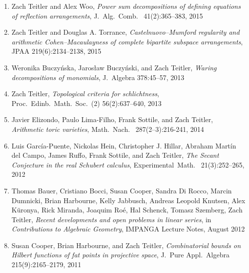\documentclass[12pt]{article}
\begin{document}
\begin{enumerate}
\item Zach Teitler and Alex Woo,
\emph{Power sum decompositions of defining equations of reflection arrangements},
J.~Alg.\ Comb.\
41(2):365--383, 2015

\item Zach Teitler and Douglas A. Torrance,
\emph{Castelnuovo--Mumford regularity and arithmetic Cohen--Macaulayness of complete bipartite subspace arrangements},
JPAA
219(6):2134--2138, 2015

\item Weronika Buczy\'nska, Jaros{\l}aw Buczy\'nski, and Zach Teitler,
\emph{Waring decompositions of monomials},
J.\ Algebra
378:45--57, 2013

\item Zach Teitler,
\emph{Topological criteria for schlichtness},
Proc.\ Edinb.\ Math.\ Soc.\ (2)
56(2):637--640, 2013

\item Javier Elizondo, Paulo Lima-Filho, Frank Sottile, and Zach Teitler,
\emph{Arithmetic toric varieties},
Math.\ Nach.\
287(2--3):216-241, 2014

\item Luis Garc\'ia-Puente, Nickolas Hein, Christopher J. Hillar, Abraham Mart\'in del Campo, James Ruffo, Frank Sottile, and Zach Teitler,
\emph{The Secant Conjecture in the real Schubert calculus},
Experimental~Math.\
21(3):252--265, 2012

\item
Thomas Bauer, Cristiano Bocci, Susan Cooper, Sandra Di Rocco, Marcin Dumnicki, Brian Harbourne, Kelly Jabbusch, Andreas Leopold Knutsen, Alex K\"uronya,
Rick Miranda, Joaquim Ro\'e, Hal Schenck, Tomasz Szemberg, Zach Teitler,
\emph{Recent developments and open problems in linear series},
in \textit{Contributions to Algebraic Geometry}, IMPANGA Lecture Notes, August 2012

\item Susan Cooper, Brian Harbourne, and Zach Teitler,
\emph{Combinatorial bounds on Hilbert functions of fat points in projective space},
J.\ Pure Appl.\ Algebra
215(9):2165--2179, 2011


\end{enumerate}
\end{document}
